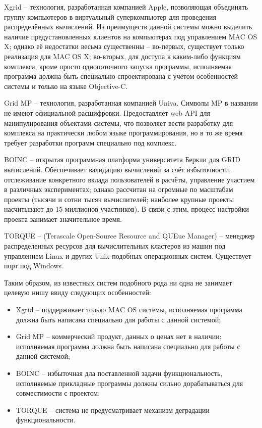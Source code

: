 \documentclass[a4paper,12pt]{report}
\numberwithin{equation}{section}
\begin{document}
  Xgrid -- технология, разработанная компанией Apple, позволяющая объединять группу компьютеров в виртуальный суперкомпьютер для проведения распределённых вычислений. 
  Из преимуществ данной системы можно выделить наличие предустановленных клиентов на компьютерах под управлением MAC OS X; однако её недостатки весьма существенны -- во-первых, существует только реализация для MAC OS X; во-вторых, для доступа к каким-либо функциям комплекса, кроме просто однопоточного запуска программы, исполняемая программа должна быть специально спроектирована с учётом особенностей системы и только на языке Objective-C.
  
  Grid MP -- технология, разработанная компанией Univa. Символы MP в названии не имеют официальной расшифровки. 
  Предоставляет web API для манипулирования объектами системы, что позволяет вести разработку для комплекса на практически любом языке программирования, но в то же время требует разработки программ специально под комплекс.
  
  BOINC -- открытая программная платформа университета Беркли для GRID вычислений. 
  Обеспечивает валидацию вычислений за счёт избыточности, отслеживание конкретного вклада пользователей в расчёты, управление участием в различных экспериментах; однако рассчитан на огромные по масштабам проекты (тысячи и сотни тысяч вычислителей; наиболее крупные проекты насчитывают до 15 миллионов участников). 
  В связи с этим, процесс настройки проекта занимает значительное время.
  
  TORQUE -- (Terascale Open-Source Resource and QUEue Manager) -- менеджер распределенных ресурсов для вычислительных кластеров из машин под управлением Linux и других Unix-подобных операционных систем. Существует порт под Windows.
  
  Таким образом, из известных систем подобного рода ни одна не занимает целевую нишу ввиду следующих особенностей: 
  \begin{itemize}
    \item Xgrid -- поддерживает только MAC OS системы, исполняемая программа должна быть написана специально для работы с данной системой;
    \item Grid MP -- коммерческий продукт, данных о ценах нет в наличии; исполняемая программа должна быть написана специально для работы с данной системой;
    \item BOINC -- избыточная дла поставленной задачи функциональность, исполняемые прикладные программы должны сильно дорабатываться для совместимости с проектом;
    \item TORQUE -- система не предусматривает механизм деградации функциональности.
  \end{itemize}
  
\end{document}

